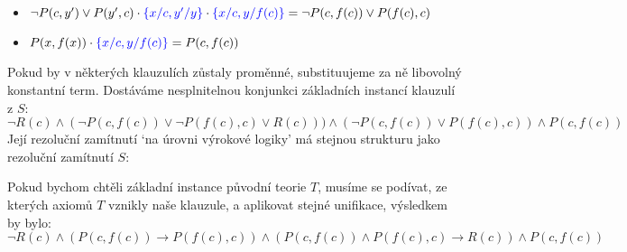 \begin{problem}
\begin{solution}
\begin{enumerate}[(a)]
\begin{itemize}
                \item $\neg P(c,y')\lor P(y',c)\cdot\textcolor{blue}{\{x/c,y'/y\}}\cdot\textcolor{blue}{\{x/c,y/f(c)\}}=\neg P(c,f(c))\lor P(f(c),c)$
                \item $P(x,f(x))\cdot\textcolor{blue}{\{x/c,y/f(c)\}}=P(c,f(c))$
            \end{itemize}
            Pokud by v některých klauzulích zůstaly proměnné, substituujeme za ně libovolný konstantní term. Dostáváme nesplnitelnou konjunkci základních instancí klauzulí z $S$:
            $$
            \neg R(c)\land (\neg P(c,f(c))\lor \neg P(f(c),c)\lor R(c)))\land (\neg P(c,f(c))\lor P(f(c),c))\land P(c,f(c))
            $$
            Její rezoluční zamítnutí `na úrovni výrokové logiky' má stejnou strukturu jako rezoluční zamítnutí $S$:
            
            \begin{minipage}{0.6\textwidth}
            \end{minipage}%
            \begin{minipage}{0.35\textwidth}
            \end{minipage} 
            Pokud bychom chtěli základní instance původní teorie $T$, musíme se podívat, ze kterých axiomů $T$ vznikly naše klauzule, a aplikovat stejné unifikace, výsledkem by bylo:
            $$
            \neg R(c)\land (P(c,f(c))\to P(f(c),c))\land (P(c,f(c))\land P(f(c),c)\to R(c))\land P(c,f(c))
            $$


        \end{enumerate}

    \end{solution}

\end{problem}

